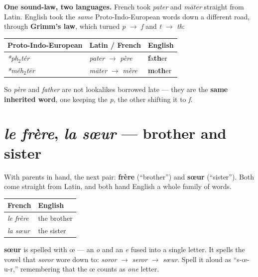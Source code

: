 \begin{grammarlens}
\textbf{One sound-law, two languages.} French took \emph{pater} and
\emph{m\=ater} straight from Latin. English took the \emph{same}
Proto-Indo-European words down a different road, through \textbf{Grimm's law},
which turned \emph{p} $\to$ \emph{f} and \emph{t} $\to$ \emph{th}:

\begin{center}
\begin{tabular}{@{}lll@{}}
\toprule
Proto-Indo-European & Latin / French & English \\
\midrule
\emph{*ph$_2$t\'{e}r} & \emph{pater} $\to$ \emph{p\`{e}re} & \textbf{f}a\textbf{th}er \\
\emph{*m\'{e}h$_2$t\=er} & \emph{m\=ater} $\to$ \emph{m\`{e}re} & \textbf{m}o\textbf{th}er \\
\bottomrule
\end{tabular}
\end{center}

So \emph{p\`{e}re} and \emph{father} are not lookalikes borrowed late --- they
are the \textbf{same inherited word}, one keeping the \emph{p}, the other
shifting it to \emph{f}.
\end{grammarlens}

\section{\emph{le fr\`{e}re}, \emph{la s\oe{}ur} --- brother and sister}
\label{lesson:freres-soeurs}

With parents in hand, the next pair: \textbf{fr\`{e}re} (``brother'') and
\textbf{s\oe{}ur} (``sister''). Both come straight from Latin, and both hand
English a whole family of words.

\begin{center}
\begin{tabular}{@{}ll@{}}
\toprule
French & English \\
\midrule
\emph{le fr\`{e}re} & the brother \\
\emph{la s\oe{}ur} & the sister \\
\bottomrule
\end{tabular}
\end{center}

\begin{sounds}
\textbf{s\oe{}ur} is spelled with \oe{} --- an \emph{o} and an \emph{e} fused
into a single letter. It spells the vowel that \emph{soror} wore down to:
\emph{soror} $\to$ \emph{seror} $\to$ \emph{s\oe{}ur}. Spell it aloud as
``s-\oe{}-u-r,'' remembering that the \oe{} counts as \emph{one} letter.
\end{sounds}

